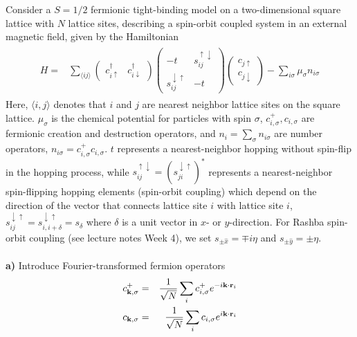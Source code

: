 \begin{problem}
	

Consider a $S=1/2$ fermionic  tight-binding model on a two-dimensional square lattice with $N$ lattice sites, describing a spin-orbit coupled system in an external magnetic field, given by the Hamiltonian 
\begin{align}
	\begin{split}
		H =&   \sum_{\langle ij \rangle} 
		\begin{pmatrix} c_{i\uparrow}^\dagger & c_{i\downarrow}^\dagger  \end{pmatrix}
		\begin{pmatrix} -t & s_{ij}^{\uparrow\downarrow} \\ s_{ij}^{\downarrow\uparrow} & -t \end{pmatrix}  
		\begin{pmatrix} c_{j\uparrow} \\ c_{j\downarrow}  \end{pmatrix}
		- \sum_{i \sigma} \mu_\sigma n_{i\sigma} \nonumber 
	\end{split}
\end{align}
Here,  $\langle i,j \rangle$ denotes that $i$ and $j$ are nearest neighbor lattice sites on the square lattice. $\mu_{\sigma}$ is the chemical potential for particles with spin $\sigma$, $c^{+}_{i,\sigma}, c_{i,\sigma}$ are fermionic creation and destruction 
operators, and $n_i = \sum_{\sigma} n_{i \sigma}$ are number operators, $n_{i \sigma} = c^{+}_{i,\sigma} c_{i,\sigma}$. $t$ represents a nearest-neighbor hopping without spin-flip in the hopping process, 
while $ s_{ij}^{\uparrow\downarrow} = (s_{ji}^{\downarrow\uparrow} )^*$ represents a nearest-neighbor spin-flipping hopping elements (spin-orbit coupling) which depend on the direction of the vector that connects lattice site $i$ with lattice site $i$, 
$s_{ij}^{\downarrow\uparrow} =s_{i, i+\delta}^{\downarrow\uparrow} = s_{\delta} $ where $\delta$ is a unit vector in $x$- or $y$-direction.  For Rashba spin-orbit coupling (see lecture notes Week 4), we set $s_{\pm \hat{ x}} = \mp i \eta$ 
and $s_{\pm \hat{y}}= \pm \eta$. 
\ \\
\ \\
{\bf a)} Introduce Fourier-transformed fermion operators 
\begin{eqnarray}
	c^{+}_{{\bf k},\sigma} & = & \frac{1}{\sqrt{N}} \sum_i c^{+}_{i,\sigma} e^{-i {\bf k} \cdot {\bf r}_i} \nonumber \\
	c_{{\bf k},\sigma} & = & \frac{1}{\sqrt{N}} \sum_i c_{i,\sigma} e^{i {\bf k} \cdot {\bf r}_i} \nonumber

\end{eqnarray}
\end{problem}

